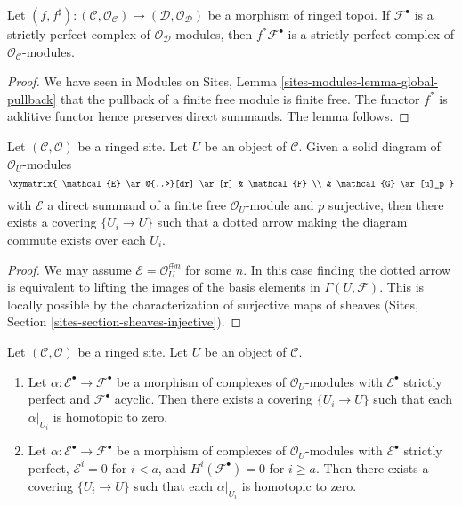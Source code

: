 \begin{lemma}
\label{lemma-strictly-perfect-pullback}
Let $(f, f^\sharp) : (\mathcal{C}, \mathcal{O}_\mathcal{C}) \to
(\mathcal{D}, \mathcal{O}_\mathcal{D})$
be a morphism of ringed topoi. If $\mathcal{F}^\bullet$ is a strictly
perfect complex of $\mathcal{O}_\mathcal{D}$-modules, then
$f^*\mathcal{F}^\bullet$ is a strictly perfect complex of
$\mathcal{O}_\mathcal{C}$-modules.
\end{lemma}

\begin{proof}
We have seen in
Modules on Sites, Lemma \ref{sites-modules-lemma-global-pullback}
that the pullback of a finite free module is finite free. The functor
$f^*$ is additive functor hence preserves direct summands. The lemma follows.
\end{proof}

\begin{lemma}
\label{lemma-local-lift-map}
Let $(\mathcal{C}, \mathcal{O})$ be a ringed site. Let $U$ be an object of
$\mathcal{C}$. Given a solid diagram of $\mathcal{O}_U$-modules
$$
\xymatrix{
\mathcal{E} \ar@{..>}[dr] \ar[r] & \mathcal{F} \\
& \mathcal{G} \ar[u]_p
}
$$
with $\mathcal{E}$ a direct summand of a finite free
$\mathcal{O}_U$-module and $p$ surjective, then there exists a
covering $\{U_i \to U\}$ such that a dotted arrow
making the diagram commute exists over each $U_i$.
\end{lemma}

\begin{proof}
We may assume $\mathcal{E} = \mathcal{O}_U^{\oplus n}$ for some $n$.
In this case finding the dotted arrow is equivalent to lifting the
images of the basis elements in $\Gamma(U, \mathcal{F})$. This is
locally possible by the characterization of surjective maps of
sheaves (Sites, Section \ref{sites-section-sheaves-injective}).
\end{proof}

\begin{lemma}
\label{lemma-local-homotopy}
Let $(\mathcal{C}, \mathcal{O})$ be a ringed site. Let $U$ be an object
of $\mathcal{C}$.
\begin{enumerate}
\item Let $\alpha : \mathcal{E}^\bullet \to \mathcal{F}^\bullet$
be a morphism of complexes of $\mathcal{O}_U$-modules
with $\mathcal{E}^\bullet$ strictly perfect and $\mathcal{F}^\bullet$
acyclic. Then there exists a covering $\{U_i \to U\}$ such that each
$\alpha|_{U_i}$ is homotopic to zero.
\item Let $\alpha : \mathcal{E}^\bullet \to \mathcal{F}^\bullet$
be a morphism of complexes of $\mathcal{O}_U$-modules
with $\mathcal{E}^\bullet$ strictly perfect, $\mathcal{E}^i = 0$
for $i < a$, and $H^i(\mathcal{F}^\bullet) = 0$ for $i \geq a$.
Then there exists a covering $\{U_i \to U\}$ such that each
$\alpha|_{U_i}$ is homotopic to zero.
\end{enumerate}
\end{lemma}

